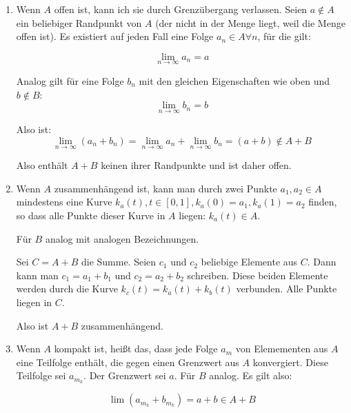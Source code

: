 \documentclass[a4paper,german,12pt,smallheadings]{scrartcl}
\begin{document}
\begin{enumerate}[(1)]
  \item
    Wenn $A$ offen ist, kann ich sie durch Grenzübergang verlassen. Seien $a
    \notin A$ ein beliebiger Randpunkt von $A$ (der nicht in der Menge liegt,
    weil die Menge offen ist). Es existiert auf jeden Fall eine Folge $a_n \in
    A \forall n$, für die gilt:

    \begin{equation*}
      \lim_{n \to \infty} a_n = a
    \end{equation*}

    Analog gilt für eine Folge $b_n$ mit den gleichen Eigenschaften wie oben
    und $b \notin B$:
    \begin{equation*}
      \lim_{n \to \infty} b_n = b
    \end{equation*}

    Also ist:
    \begin{equation*}
      \lim_{n \to \infty} (a_n + b_n) = \lim_{n \to \infty} a_n + \lim_{n \to \infty} b_n = (a + b) \notin A + B
    \end{equation*}

    Also enthält $A+B$ keinen ihrer Randpunkte und ist daher offen.

  \item
    Wenn $A$ zusammenhängend ist, kann man durch zwei Punkte $a_1, a_2 \in A$
    mindestens eine Kurve $k_a(t), t \in [0,1], k_a(0) = a_1, k_a(1) = a_2$
    finden, so dass alle Punkte dieser Kurve in $A$ liegen: $k_a(t) \in A$.

    Für $B$ analog mit analogen Bezeichnungen.

    Sei $C = A+B$ die Summe. Seien $c_1$ und $c_2$ beliebige Elemente aus $C$.
    Dann kann man $c_1 = a_1 + b_1$ und $c_2 = a_2 + b_2$ schreiben. Diese
    beiden Elemente werden durch die Kurve $k_c(t) = k_a(t) + k_b(t)$
    verbunden. Alle Punkte liegen in $C$.

    Also ist $A+B$ zusammenhängend.
  \item
    Wenn $A$ kompakt ist, heißt das, dass jede Folge $a_m$ von Elemementen aus
    $A$ eine Teilfolge enthält, die gegen einen Grenzwert aus $A$ konvergiert.
    Diese Teilfolge sei $a_{m_k}$. Der Grenzwert sei $a$. Für $B$ analog. Es
    gilt also:

    \begin{equation*}
      \lim (a_{m_k} + b_{m_k}) = a + b \in A + B
    \end{equation*}


\end{enumerate}
\end{document}
